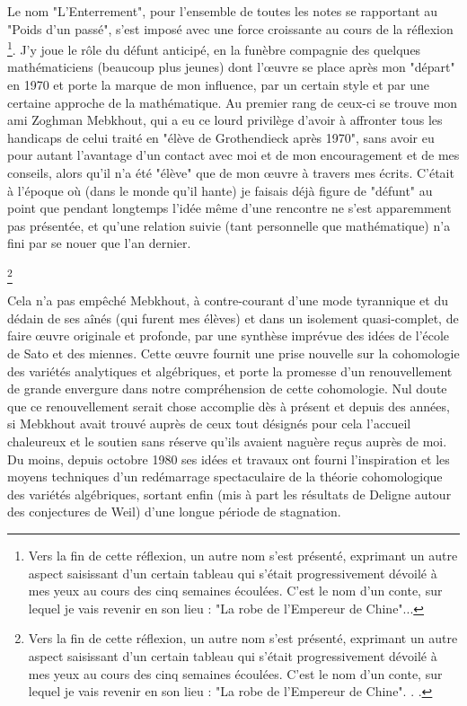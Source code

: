 Le nom "L'Enterrement", pour l'ensemble de toutes les notes se rapportant au "Poids d'un passé", s'est imposé avec une force croissante au cours de la réflexion \footnote{Vers la fin de cette réflexion, un autre nom s'est présenté, exprimant un autre aspect saisissant d'un certain tableau qui s'était progressivement dévoilé à mes yeux au cours des cinq semaines écoulées. C'est le nom d'un conte, sur lequel je vais revenir en son lieu : "La robe de l'Empereur de Chine"...}. J'y joue le rôle du défunt anticipé, en la funèbre compagnie des quelques mathématiciens (beaucoup plus jeunes) dont l'œuvre se place après mon "départ" en 1970 et porte la marque de mon influence, par un certain style et par une certaine approche de la mathématique. Au premier rang de ceux-ci se trouve mon ami Zoghman Mebkhout, qui a eu ce lourd privilège d'avoir à affronter tous les handicaps de celui traité en "élève de Grothendieck après 1970", sans avoir eu pour autant l'avantage d'un contact avec moi et de mon encouragement et de mes conseils, alors qu'il n'a été "élève" que de mon œuvre à travers mes écrits. C'était à l'époque où (dans le monde qu'il hante) je faisais déjà figure de "défunt" au point que pendant longtemps l'idée même d'une rencontre ne s'est apparemment pas présentée, et qu'une relation suivie (tant personnelle que mathématique) n'a fini par se nouer que l'an dernier.

\footnote{Vers la fin de cette réflexion, un autre nom s’est présenté, exprimant un autre aspect saisissant d’un certain tableau qui s’était progressivement dévoilé à mes yeux au cours des cinq semaines écoulées. C’est le nom d’un conte, sur lequel je vais revenir en son lieu : "La robe de l’Empereur de Chine". . .}

Cela n'a pas empêché Mebkhout, à contre-courant d'une mode tyrannique et du dédain de ses aînés (qui furent mes élèves) et dans un isolement quasi-complet, de faire œuvre originale et profonde, par une synthèse imprévue des idées de l'école de Sato et des miennes. Cette œuvre fournit une prise nouvelle sur la cohomologie des variétés analytiques et algébriques, et porte la promesse d'un renouvellement de grande envergure dans notre compréhension de cette cohomologie. Nul doute que ce renouvellement serait chose accomplie dès à présent et depuis des années, si Mebkhout avait trouvé auprès de ceux tout désignés pour cela l'accueil chaleureux et le soutien sans réserve qu'ils avaient naguère reçus auprès de moi. Du moins, depuis octobre 1980 ses idées et travaux ont fourni l'inspiration et les moyens techniques d'un redémarrage spectaculaire de la théorie cohomologique des variétés algébriques, sortant enfin (mis à part les résultats de Deligne autour des conjectures de Weil) d'une longue période de stagnation.

